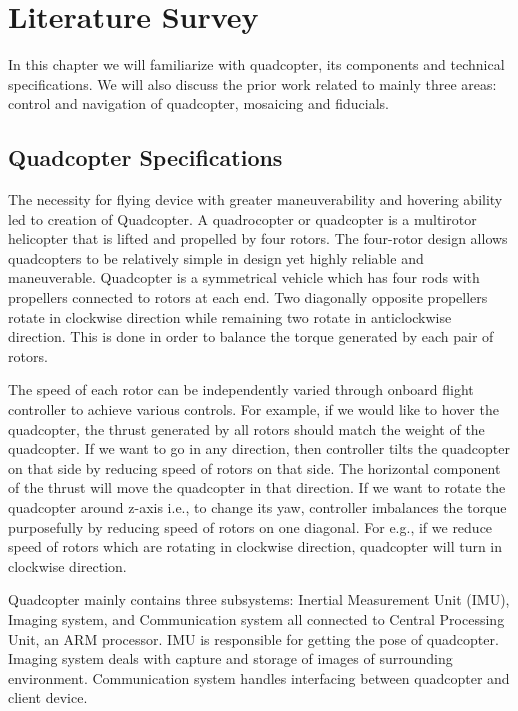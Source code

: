 \chapter{Literature Survey}
\label{ch:quadcopter}
In this chapter we will familiarize with quadcopter, its components and
technical specifications. We will also discuss the prior work related to
mainly three areas: control and navigation of quadcopter, mosaicing and
fiducials. 
\section{Quadcopter Specifications}
The necessity for flying device with greater maneuverability and hovering
ability led to creation of Quadcopter. A quadrocopter or quadcopter  is a
multirotor helicopter that is lifted and propelled by four rotors. The
four-rotor design allows quadcopters to be relatively simple in design yet
highly reliable and maneuverable. Quadcopter  is a  symmetrical vehicle which
has four rods with propellers connected to rotors  at each end. Two diagonally
opposite propellers rotate in clockwise direction while remaining  two rotate
in anticlockwise direction. This is done in order to balance the torque
generated by each pair of rotors. 

The speed of each rotor can be independently varied through onboard flight
controller to achieve various controls. For example, if we would like to hover
the quadcopter, the thrust generated by all rotors should match the weight of the
quadcopter. If we want to go in any direction, then controller tilts the
quadcopter on that side by reducing speed of rotors on that side. The horizontal component of
the thrust will move the quadcopter in that direction. If we want to rotate the
quadcopter around z-axis i.e., to change its yaw, controller imbalances the
torque purposefully by reducing speed of rotors on one diagonal. For e.g., if we reduce
speed of rotors which are rotating in clockwise direction, quadcopter will turn
in clockwise direction.

Quadcopter mainly contains three subsystems: Inertial Measurement Unit (IMU),
Imaging system, and Communication system all connected to Central Processing
Unit, an ARM processor. IMU is responsible for getting the pose of quadcopter.
Imaging system deals with capture and storage of images of surrounding
environment. Communication system handles interfacing between quadcopter and
client device.

